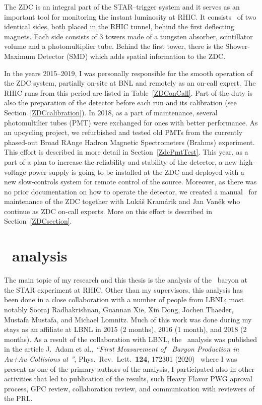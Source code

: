 The ZDC is an integral part of the STAR--trigger system and it serves as an important tool for monitoring the instant luminosity at RHIC\@. It consists~\cite{ZDC, ZDCSMD} of two identical sides, both placed in the RHIC tunnel, behind 
the first deflecting magnets. Each side consists of 3 towers made of a tungsten absorber, scintillator volume and a photomultiplier tube.
Behind the first tower, there is the Shower-Maximum Detector (SMD) which adds spatial information to the ZDC\@.

In the years 2015--2019, I was personally responsible for the smooth operation of the ZDC system, partially on-site at BNL and remotely as an on-call expert. The RHIC runs from this period are listed in Table~\ref{ZDConCall}\@. Part of the duty is also the preparation of the detector before each run and its calibration (see Section~\ref{ZDCcalibration}). In 2018, as a part of  maintenance, several photomultilier tubes (PMT) were exchanged for ones with better performance. As an upcycling project, we refurbished and tested old PMTs from the currently phased-out Broad RAnge Hadron Magnetic Spectrometers (Brahms) experiment. This effort is described in more detail in Section~\ref{ZdcPmtTest}\@. This year, as a part of a plan to increase the reliability and stability of the detector, a new high-voltage power supply is going to be installed at the ZDC and deployed with a new slow-controls system for remote control of the source. Moreover, as there was no prior documentation on how to operate the detector, we created a manual~\cite{ZDCmanual} for maintenance of the ZDC together with Lukáš Kramárik and Jan Vaněk who continue as ZDC on-call experts. More on this effort is described in Section~\ref{ZDCsection}\@.

\section*{\Lambdac\ analysis}
The main topic of my research and this thesis is the analysis of the \Lambdac\ baryon at the STAR experiment at RHIC\@. Other than my supervisors, this analysis has been done in a close collaboration with a number of people from LBNL; most notably Sooraj Radhakrishnan, Guannan Xie, Xin Dong, Jochen Thaeder, Mustafa Mustafa, and Michael Lomnitz. Much of this work was done during my stays as an affiliate at LBNL in 2015 (2 months), 2016 (1 month), and 2018 (2 months)\@. 
As a result of the collaboration with LBNL, the \Lambdac\ analysis was published in the article J.\ Adam et al., \emph{``First Measurement of \Lambdac\ Baryon Production in Au+Au Collisions at \snnFull''}, Phys.\ Rev.\ Lett.\ \textbf{124}, 172301 (2020)~\cite{LambdacPaper} where I was present as one of the primary authors of the analysis, I participated also in other activities that led to publication of the results, such Heavy Flavor PWG aproval process, GPC review, collaboration review, and communication with reviewers of the PRL\@.

